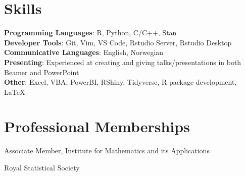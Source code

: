 \documentclass[letterpaper,11pt]{article}
\begin{document}
\section{Skills}
 \begin{itemize}[leftmargin=0.15in, label={}]
    \small{\item{
     \textbf{Programming Languages}{: R, Python, C/C++, Stan} \\
     \textbf{Developer Tools}{: Git, Vim,  VS Code, Rstudio Server, Rstudio Desktop} \\
     \textbf{Communicative Languages}: English, Norwegian \\
     \textbf{Presenting}{: Experienced at creating and giving talks/presentations in both Beamer and PowerPoint} \\
    \textbf{Other}{: Excel, VBA, PowerBI, RShiny, Tidyverse, R package development, \LaTeX}
    }}
\end{itemize}

\section{Professional Memberships}
\begin{itemize}[leftmargin=0.15in, label={}]
    \small{\item{Associate Member, Institute for Mathematics and its Applications} \\
           \item{Royal Statistical Society}}
\end{itemize}


\end{document}
